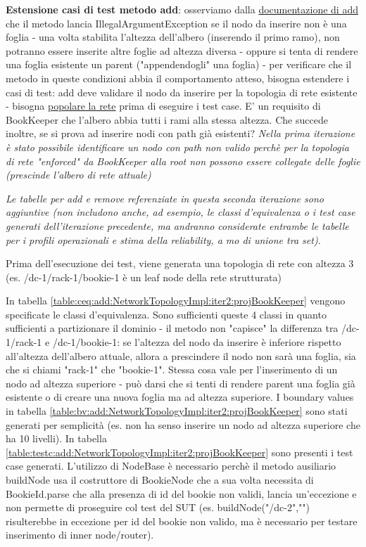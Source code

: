 \documentclass[10pt, a4paper]{article}
\newcommand{\gettablelabel}[5]{table:#1:#2:#3:iter#4:proj#5}
\def\bookkeeper{BookKeeper}
\begin{document}
	\textbf{Estensione casi di test metodo add}: osserviamo dalla 
	\href{https://bookkeeper.apache.org/docs/latest/api/javadoc/org/apache/bookkeeper/net/NetworkTopologyImpl.html#add(org.apache.bookkeeper.net.Node)}
	{documentazione di add}
	che il metodo lancia IllegalArgumentException se il nodo da inserire non è una foglia - una volta stabilita 
	l'altezza dell'albero (inserendo
	il primo ramo), non potranno essere inserite altre foglie ad altezza diversa - oppure si tenta
	di rendere una foglia esistente un parent ("appendendogli" una foglia) - per verificare che il metodo
	in queste condizioni abbia il comportamento atteso, bisogna estendere i casi di test: add deve validare il 
	nodo da inserire per la topologia di rete esistente - bisogna \underline{popolare la rete} prima di eseguire i test case. 
	E' un requisito di \bookkeeper\; che l'albero abbia tutti i rami alla stessa altezza.
	Che succede inoltre, se si prova ad inserire nodi con path già esistenti?
	\textit{Nella prima iterazione è stato possibile identificare un nodo con path non valido perchè per la topologia
	di rete "enforced" da \bookkeeper\; alla root non possono essere collegate delle foglie (prescinde l'albero
	di rete attuale)}
	
	\textit{Le tabelle per add e remove referenziate in questa seconda iterazione sono aggiuntive (non includono anche,
	ad esempio, le classi d'equivalenza o i test case generati dell'iterazione precedente, ma andranno considerate
	entrambe le tabelle per i profili operazionali e stima della reliability, a mo di unione tra set).}
	
	Prima dell'esecuzione dei test, viene generata una topologia di rete con altezza 3 (es. /dc-1/rack-1/bookie-1 
	è un leaf node della rete strutturata)
	
	In tabella \ref{\gettablelabel{ceq}{add}{NetworkTopologyImpl}{2}{\bookkeeper}} vengono specificate le
	classi d'equivalenza. Sono sufficienti queste 4 classi in quanto sufficienti a partizionare il dominio -
	il metodo non "capisce" la differenza tra /dc-1/rack-1 e /dc-1/bookie-1: se l'altezza del nodo da inserire
	è inferiore rispetto all'altezza dell'albero attuale, allora a prescindere il nodo non sarà una foglia, sia
	che si chiami "rack-1" che "bookie-1". Stessa cosa vale per l'inserimento di un nodo ad altezza superiore -
	può darsi che si tenti di rendere parent una foglia già esistente o di creare una nuova foglia ma ad altezza
	superiore. I boundary values in tabella \ref{\gettablelabel{bv}{add}{NetworkTopologyImpl}{2}{\bookkeeper}}
	sono stati generati per semplicità (es. non ha senso inserire un nodo ad altezza superiore che ha 10 livelli). In tabella \ref{\gettablelabel{testc}{add}{NetworkTopologyImpl}{2}{\bookkeeper}} sono presenti i test
	case generati. L'utilizzo di NodeBase è necessario perchè il metodo ausiliario buildNode usa il costruttore di
	BookieNode che a sua volta necessita di BookieId.parse che alla presenza di id del bookie non validi, lancia
	un'eccezione e non permette di proseguire col test del SUT (es. buildNode("/dc-2","") risulterebbe in eccezione per id del bookie non valido, ma è necessario per testare inserimento di inner node/router).
	
\end{document}
